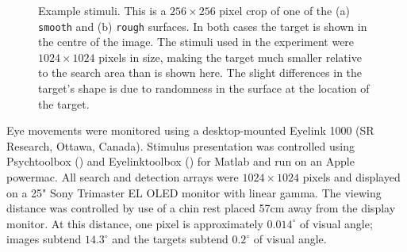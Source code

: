 \documentclass[preprint, authoryear]{elsarticle} %
\begin{document}
\begin{figure}[tb]
	\centering
	\caption{Example stimuli. This is a $256\times 256$ pixel crop of one of the (a) \texttt{smooth} and (b) \texttt{rough} surfaces. In both cases the target is shown in the centre of the image. The stimuli used in the experiment were $1024\times 1024$ pixels in size, making the target much smaller relative to the search area than is shown here. The slight differences in the target's shape is due to randomness in the surface at the location of the target.} 
	\label{fig:exampleStimuli}
\end{figure}
\par
 
Eye movements were monitored using a desktop-mounted Eyelink 1000 (SR Research, Ottawa, Canada). Stimulus presentation was controlled using Psychtoolbox (\cite{brainard1997}) and Eyelinktoolbox (\cite {cornelissen2002}) for Matlab and run on an Apple powermac. All search and detection arrays were $1024\times 1024$ pixels and displayed on a 25" Sony Trimaster EL OLED monitor with linear gamma. The viewing distance was controlled by use of a chin rest placed 57cm away from the display monitor. At this distance, one pixel is approximately $0.014^{\circ}$ of visual angle; images subtend $14.3^{\circ}$ and the targets subtend $0.2^{\circ}$ of visual angle. 
\end{document}
